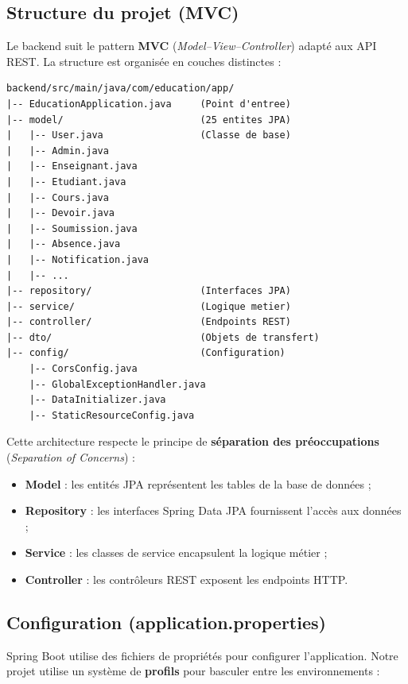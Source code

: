 \subsection{Structure du projet (MVC)}

Le backend suit le pattern \textbf{MVC} (\textit{Model–View–Controller}) adapté aux API REST. La structure est organisée en couches distinctes :

\begin{lstlisting}[caption={Arborescence du backend},basicstyle=\small\ttfamily]
backend/src/main/java/com/education/app/
|-- EducationApplication.java     (Point d'entree)
|-- model/                        (25 entites JPA)
|   |-- User.java                 (Classe de base)
|   |-- Admin.java
|   |-- Enseignant.java
|   |-- Etudiant.java
|   |-- Cours.java
|   |-- Devoir.java
|   |-- Soumission.java
|   |-- Absence.java
|   |-- Notification.java
|   |-- ...
|-- repository/                   (Interfaces JPA)
|-- service/                      (Logique metier)
|-- controller/                   (Endpoints REST)
|-- dto/                          (Objets de transfert)
|-- config/                       (Configuration)
    |-- CorsConfig.java
    |-- GlobalExceptionHandler.java
    |-- DataInitializer.java
    |-- StaticResourceConfig.java
\end{lstlisting}

Cette architecture respecte le principe de \textbf{séparation des préoccupations} (\textit{Separation of Concerns}) :
\begin{itemize}[noitemsep]
    \item \textbf{Model} : les entités JPA représentent les tables de la base de données ;
    \item \textbf{Repository} : les interfaces Spring Data JPA fournissent l'accès aux données ;
    \item \textbf{Service} : les classes de service encapsulent la logique métier ;
    \item \textbf{Controller} : les contrôleurs REST exposent les endpoints HTTP.
\end{itemize}

\subsection{Configuration (application.properties)}

Spring Boot utilise des fichiers de propriétés pour configurer l'application. Notre projet utilise un système de \textbf{profils} pour basculer entre les environnements :

